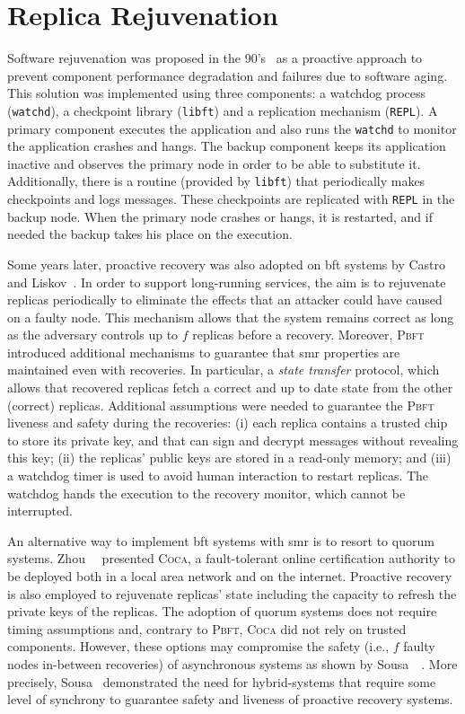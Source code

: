 \section{Replica Rejuvenation}
Software rejuvenation was proposed in the 90's~\cite{Huang:1993,Huang:1995} as a proactive approach to prevent component performance degradation and failures due to software aging. 
This solution was implemented using three components: a watchdog process (\texttt{watchd}), a checkpoint library (\texttt{libft}) and a replication mechanism (\texttt{REPL}). 
A primary component executes the application and also runs the \texttt{watchd} to monitor the application crashes and hangs. 
The backup component keeps its application inactive and observes the primary node in order to be able to substitute it. 
Additionally, there is a routine (provided by \texttt{libft}) that periodically makes checkpoints and logs messages. 
These checkpoints are replicated with \texttt{REPL} in the backup node. 
When the primary node crashes or hangs, it is restarted, and if needed the backup takes his place on the execution.


Some years later, proactive recovery was also adopted on \gls{bft} systems by Castro and Liskov~\cite{Castro:2002}.
In order to support long-running services, the aim is to rejuvenate replicas periodically to eliminate the effects that an attacker could have caused on a faulty node. 
This mechanism allows that the system remains correct as long as the adversary controls up to $f$ replicas before a recovery.
Moreover, \textsc{Pbft} introduced additional mechanisms to guarantee that \gls{smr} properties are maintained even with recoveries.
In particular, a \emph{state transfer} protocol, which allows that recovered replicas fetch a correct and up to date state from the other (correct) replicas.
Additional assumptions were needed to guarantee the \textsc{Pbft} liveness and safety during the recoveries: 
(i) each replica contains a trusted chip to store its private key, and that can sign and decrypt messages without revealing this key; 
(ii) the replicas' public keys are stored in a read-only memory; 
and (iii) a watchdog timer is used to avoid human interaction to restart replicas.
The watchdog hands the execution to the recovery monitor, which cannot be interrupted.

An alternative way to implement \gls{bft} systems with \gls{smr} is to resort to quorum systems.
Zhou~\etal{}~\cite{Zhou:2002} presented \textsc{Coca}, a fault-tolerant online certification authority to be deployed both in a local area network and on the internet.
Proactive recovery is also employed to rejuvenate replicas' state including the capacity to refresh the private keys of the replicas.
The adoption of quorum systems does not require timing assumptions and, contrary to \textsc{Pbft}, \textsc{Coca} did not rely on trusted components.
However, these options may compromise the safety (i.e., $f$ faulty nodes in-between recoveries) of asynchronous systems as shown by Sousa~\etal{}~\cite{Sousa:2007}. 
More precisely, Sousa~\etal{} demonstrated the need for hybrid-systems that require some level of synchrony to guarantee safety and liveness of proactive recovery systems.


